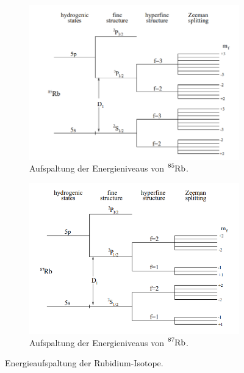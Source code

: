 \begin{figure}[H]
    \centering
    \begin{subfigure}[b]{0.45\textwidth}
        \centering
        \includegraphics[height=0.3\textheight]{images/rub85.png}
        \caption{Aufspaltung der Energieniveaus von $\ce{^{85}Rb}$.}
        \label{fig:rubidium_85}
    \end{subfigure}
    \hfill
    \begin{subfigure}[b]{0.45\textwidth}
        \centering
        \includegraphics[height=0.3\textheight]{images/rub87.png}
        \caption{Aufspaltung der Energieniveaus von $\ce{^{87}Rb}$.}
        \label{fig:rubidium_87}
    \end{subfigure}
    \caption{Energieaufspaltung der Rubidium-Isotope. \cite{optical_pumping_princeton}}
    \label{fig:rubidium}
\end{figure}

